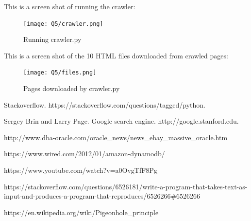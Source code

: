 \documentclass[a4paper, 11pt]{article}
\begin{document}
This is a screen shot of running the crawler:

\begin{figure}[h]
\caption{Running crawler.py}
\centering
\texttt{[image: Q5/crawler.png]}
\end{figure}

\pagebreak

This is a screen shot of the 10 HTML files downloaded from crawled pages:

\begin{figure}[h]
\caption{Pages downloaded by crawler.py}
\centering
\texttt{[image: Q5/files.png]}
\end{figure}

\begin{thebibliography}{9}

\bibitem{} 
Stackoverflow. https://stackoverflow.com/questions/tagged/python.

\bibitem{} 
Sergey Brin and Larry Page. Google search engine. http://google.stanford.edu.

\bibitem{}
http://www.dba-oracle.com/oracle\_news/news\_ebay\_massive\_oracle.htm

\bibitem{}
https://www.wired.com/2012/01/amazon-dynamodb/

\bibitem{}
https://www.youtube.com/watch?v=a0OvgTfF8Pg

\bibitem{}
https://stackoverflow.com/questions/6526181/write-a-program-that-takes-text-as-input-and-produces-a-program-that-reproduces/6526266\#6526266

\bibitem{}
https://en.wikipedia.org/wiki/Pigeonhole\_principle


\end{thebibliography}
\end{document}

